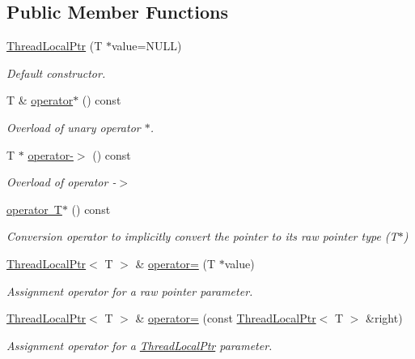 \subsection*{Public Member Functions}
\begin{DoxyCompactItemize}
\item 
\mbox{\hyperlink{classsf_1_1_thread_local_ptr_a8c678211d7828d2a8c41cb534422d649}{Thread\+Local\+Ptr}} (T $\ast$value=N\+U\+LL)
\begin{DoxyCompactList}\small\item\em Default constructor. \end{DoxyCompactList}\item 
T \& \mbox{\hyperlink{classsf_1_1_thread_local_ptr_adcbb45ae077df714bf9c61e936d97770}{operator$\ast$}} () const
\begin{DoxyCompactList}\small\item\em Overload of unary operator $\ast$. \end{DoxyCompactList}\item 
T $\ast$ \mbox{\hyperlink{classsf_1_1_thread_local_ptr_a25646e1014a933d1a45b9ce17bab7703}{operator-\/$>$}} () const
\begin{DoxyCompactList}\small\item\em Overload of operator -\/$>$ \end{DoxyCompactList}\item 
\mbox{\hyperlink{classsf_1_1_thread_local_ptr_a81ca089ae5cda72c7470ca93041c3cb2}{operator T$\ast$}} () const
\begin{DoxyCompactList}\small\item\em Conversion operator to implicitly convert the pointer to its raw pointer type (T$\ast$) \end{DoxyCompactList}\item 
\mbox{\hyperlink{classsf_1_1_thread_local_ptr}{Thread\+Local\+Ptr}}$<$ T $>$ \& \mbox{\hyperlink{classsf_1_1_thread_local_ptr_a14dcf1cdf5f6b3bcdd633014b2b671f5}{operator=}} (T $\ast$value)
\begin{DoxyCompactList}\small\item\em Assignment operator for a raw pointer parameter. \end{DoxyCompactList}\item 
\mbox{\hyperlink{classsf_1_1_thread_local_ptr}{Thread\+Local\+Ptr}}$<$ T $>$ \& \mbox{\hyperlink{classsf_1_1_thread_local_ptr_a6792a6a808af06f0d13e3ceecf2fc947}{operator=}} (const \mbox{\hyperlink{classsf_1_1_thread_local_ptr}{Thread\+Local\+Ptr}}$<$ T $>$ \&right)
\begin{DoxyCompactList}\small\item\em Assignment operator for a \mbox{\hyperlink{classsf_1_1_thread_local_ptr}{Thread\+Local\+Ptr}} parameter. \end{DoxyCompactList}\end{DoxyCompactItemize}
